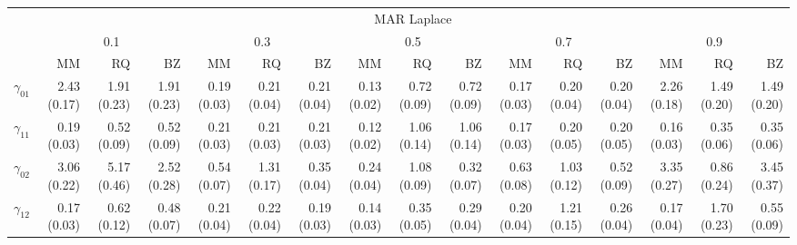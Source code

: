 \documentclass[12pt]{article}
\begin{document}
\begin{landscape}
\begin{table}[ht]
  \begin{tabular}{rrrrrrrrrrrrrrrr}
    \toprule
    & \multicolumn{15}{c}{MAR Laplace} \\
    \cline{2-16}
    &  \multicolumn{3}{c}{0.1} &  \multicolumn{3}{c}{0.3} &  \multicolumn{3}{c}{0.5} &
    \multicolumn{3}{c}{0.7} &  \multicolumn{3}{c}{0.9} \\
    \cline{2-16}
    & MM   & RQ   & BZ   & MM   & RQ   & BZ   & MM   & RQ   & BZ   & MM   & RQ   & BZ   & MM   & RQ   & BZ   \\
    \hline
    $\gamma_{01}$ &2.43 (0.17) & 1.91 (0.23) & 1.91 (0.23) & 0.19 (0.03) & 0.21 (0.04) & 0.21 (0.04) & 0.13 (0.02) & 0.72 (0.09) & 0.72 (0.09) & 0.17 (0.03) & 0.20 (0.04) & 0.20 (0.04) & 2.26 (0.18) & 1.49 (0.20) & 1.49 (0.20) \\
    $\gamma_{11}$ &0.19 (0.03) & 0.52 (0.09) & 0.52 (0.09) & 0.21 (0.03) & 0.21 (0.03) & 0.21 (0.03) & 0.12 (0.02) & 1.06 (0.14) & 1.06 (0.14) & 0.17 (0.03) & 0.20 (0.05) & 0.20 (0.05) & 0.16 (0.03) & 0.35 (0.06) & 0.35 (0.06) \\
    $\gamma_{02}$ &3.06 (0.22) & 5.17 (0.46) & 2.52 (0.28) & 0.54 (0.07) & 1.31 (0.17) & 0.35 (0.04) & 0.24 (0.04) & 1.08 (0.09) & 0.32 (0.07) & 0.63 (0.08) & 1.03 (0.12) & 0.52 (0.09) & 3.35 (0.27) & 0.86 (0.24) & 3.45 (0.37) \\
    $\gamma_{12}$ &0.17 (0.03) & 0.62 (0.12) & 0.48 (0.07) & 0.21 (0.04) & 0.22 (0.04) & 0.19 (0.03) & 0.14 (0.03) & 0.35 (0.05) & 0.29 (0.04) & 0.20 (0.04) & 1.21 (0.15) & 0.26 (0.04) & 0.17 (0.04) & 1.70 (0.23) & 0.55 (0.09) \\
    \bottomrule
  \end{tabular}

\end{table}
\end{landscape}
\end{document}
